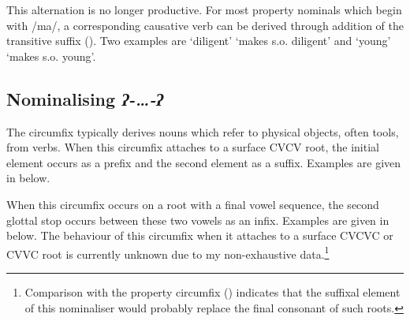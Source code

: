 This alternation is no longer productive.
For most property nominals which begin with /ma/,
a corresponding causative verb can be derived through
addition of the transitive suffix  ().
Two examples are  `diligent' {\ra}  `makes s.o. diligent'
and  `young' {\ra}  `makes s.o. young'.

\subsection{Nominalising \it{ʔ-{\ldots}-ʔ}}\label{sec:NomQ--q}
The circumfix 
typically derives nouns which refer to physical objects, often tools, from verbs.
When this circumfix attaches to a surface CVCV root,
the initial element occurs as a prefix and the second element as a suffix.
Examples are given in  below.

\begin{exe}
	\label{ex:NomCir2}
\end{exe}

When this circumfix occurs on a root with a final vowel sequence,
the second glottal stop occurs between these two vowels as an infix.
Examples are given in  below.
The behaviour of this circumfix when it attaches to a surface
CVCVC or CVVC root is currently unknown due to my non-exhaustive data.\footnote{
		Comparison with the property circumfix  ()
		indicates that the suffixal element of this nominaliser would probably
		replace the final consonant of such roots.}

\begin{exe}
	\label{ex:NomCirInf2}
\end{exe}

